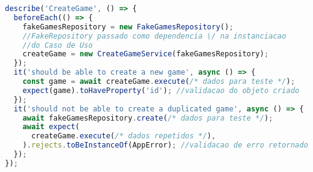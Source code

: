 \begin{lstlisting}[language=JavaScript, caption={Módulo de teste },captionpos=b, label=alg:creategametest]
describe('CreateGame', () => {
  beforeEach(() => {
    fakeGamesRepository = new FakeGamesRepository();
    //FakeRepository passado como dependencia \/ na instanciacao 
    //do Caso de Uso
    createGame = new CreateGameService(fakeGamesRepository);
  });
  it('should be able to create a new game', async () => {
    const game = await createGame.execute(/* dados para teste */);
    expect(game).toHaveProperty('id'); //validacao do objeto criado
  });
  it('should not be able to create a duplicated game', async () => {
    await fakeGamesRepository.create(/* dados para teste */);
    await expect(
      createGame.execute(/* dados repetidos */),
    ).rejects.toBeInstanceOf(AppError); //validacao de erro retornado
  });
});
\end{lstlisting}